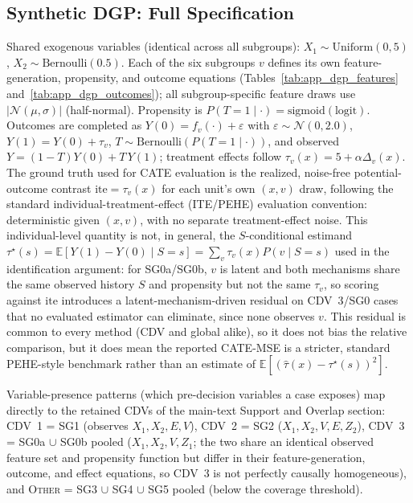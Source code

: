 \documentclass[manuscript,review,natbib=false]{acmart}
\begin{document}
\subsection{Synthetic DGP: Full Specification}
\label{app:dgp}
Shared exogenous variables (identical across all subgroups): $X_1\sim\mathrm{Uniform}(0,5)$, $X_2\sim\mathrm{Bernoulli}(0.5)$. Each of the six subgroups $v$ defines its own feature-generation, propensity, and outcome equations (Tables~\ref{tab:app_dgp_features} and~\ref{tab:app_dgp_outcomes}); all subgroup-specific feature draws use $|\mathcal{N}(\mu,\sigma)|$ (half-normal). Propensity is $P(T{=}1\mid\cdot)=\mathrm{sigmoid}(\text{logit})$. Outcomes are completed as $Y(0)=f_v(\cdot)+\varepsilon$ with $\varepsilon\sim\mathcal{N}(0,2.0)$, $Y(1)=Y(0)+\tau_v$, $T\sim\mathrm{Bernoulli}(P(T{=}1\mid\cdot))$, and observed $Y=(1-T)Y(0)+T\,Y(1)$; treatment effects follow $\tau_v(x)=5+\alpha\Delta_v(x)$. The ground truth used for CATE evaluation is the realized, noise-free potential-outcome contrast $\mathrm{ite}=\tau_v(x)$ for each unit's own $(x,v)$ draw, following the standard individual-treatment-effect (ITE/PEHE) evaluation convention: deterministic given $(x,v)$, with no separate treatment-effect noise. This individual-level quantity is not, in general, the $S$-conditional estimand $\tau^\star(s)=\mathbb E[Y(1)-Y(0)\mid S{=}s]=\sum_v\tau_v(x)P(v\mid S{=}s)$ used in the identification argument: for SG0a/SG0b, $v$ is latent and both mechanisms share the same observed history $S$ and propensity but not the same $\tau_v$, so scoring against $\mathrm{ite}$ introduces a latent-mechanism-driven residual on CDV~3/SG0 cases that no evaluated estimator can eliminate, since none observes $v$. This residual is common to every method (CDV and global alike), so it does not bias the relative comparison, but it does mean the reported CATE-MSE is a stricter, standard PEHE-style benchmark rather than an estimate of $\mathbb E[(\hat\tau(x)-\tau^\star(s))^2]$.

Variable-presence patterns (which pre-decision variables a case exposes) map directly to the retained CDVs of the main-text Support and Overlap section: CDV~1 = SG1 (observes $X_1,X_2,E,V$), CDV~2 = SG2 ($X_1,X_2,V,E,Z_2$), CDV~3 = SG0a $\cup$ SG0b pooled ($X_1,X_2,V,Z_1$; the two share an identical observed feature set and propensity function but differ in their feature-generation, outcome, and effect equations, so CDV~3 is not perfectly causally homogeneous), and \textsc{Other} = SG3 $\cup$ SG4 $\cup$ SG5 pooled (below the coverage threshold).
\end{document}
